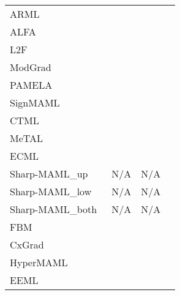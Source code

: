\begin{table}[t!]
{\begin{tabular}{lccc}
    
    ARML~\cite{yao2020automated}                       & \quad \;                      & \quad \; \\
    ALFA~\cite{baik2020meta}                           & \quad \;                      & \quad \; \\
    
    
    L2F~\cite{baik2020learning}                        & \quad \;                      & \quad \; \\
    ModGrad~\cite{simon2020modulating}                 & \quad \;                      & \quad \; \\
    PAMELA~\cite{rajasegaran2020meta}                  & \quad \;                      & \quad \; \\
    SignMAML~\cite{fan2021sign}                        & \quad \;                      & \quad \; \\
    CTML~\cite{peng2021clustered}                      & \quad \;                      & \quad \; \\
    MeTAL~\cite{baik2021meta}                        & \quad \;                      & \quad \; \\
    ECML~\cite{hiller2022enforcing}                    & \quad \;                      & \quad \; \\
    Sharp-MAML\_{up}~\cite{abbas2022sharp}              & \quad \;  N/A          & \quad \;  N/A\\
    Sharp-MAML\_{low}~\cite{abbas2022sharp}             & \quad \;  N/A          & \quad \;  N/A\\
    Sharp-MAML\_{both}~\cite{abbas2022sharp}            & \quad \;  N/A          & \quad \;  N/A\\
    FBM~\cite{yang2022calibrating}                     & \quad \;                      & \quad \; \\
    CxGrad~\cite{lee2022contextual}                    & \quad \;                      & \quad \; \\
    HyperMAML~\cite{przewikezlikowski2022hypermaml}     & \quad \;                      & \quad \; \\
    
    
    
EEML~\cite{li2022eeml}                             & \quad \;                      & \quad \; \\
    
   
    

\end{tabular}}
\end{table}
